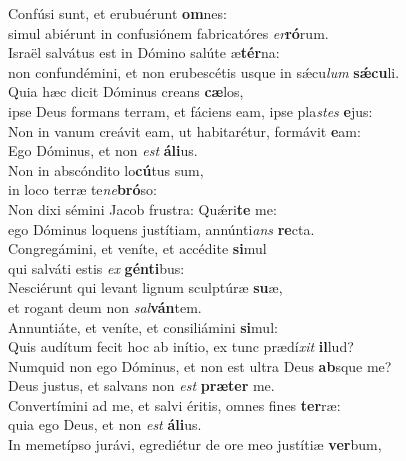 \evenverse Confúsi sunt, et erubuérunt \textbf{om}nes:~\*\\
\evenverse simul abiérunt in confusiónem fabricatóres \textit{er}\textbf{ró}rum.\\
\oddverse Israël salvátus est in Dómino salúte æ\textbf{tér}na:~\*\\
\oddverse non confundémini, et non erubescétis usque in sǽcu\textit{lum} \textbf{sǽ}\textbf{cu}li.\\
\evenverse Quia hæc dicit Dóminus creans \textbf{cæ}los,~\*\\
\evenverse ipse Deus formans terram, et fáciens eam, ipse pla\textit{stes} \textbf{e}jus:\\
\oddverse Non in vanum creávit eam, ut habitarétur, formávit \textbf{e}am:~\*\\
\oddverse Ego Dóminus, et non \textit{est} \textbf{á}\textbf{li}us.\\
\evenverse Non in abscóndito lo\textbf{cú}tus sum,~\*\\
\evenverse in loco terræ te\textit{ne}\textbf{bró}so:\\
\oddverse Non dixi sémini Jacob frustra: Quǽri\textbf{te} me:~\*\\
\oddverse ego Dóminus loquens justítiam, annúnti\textit{ans} \textbf{re}cta.\\
\evenverse Congregámini, et veníte, et accédite \textbf{si}mul~\*\\
\evenverse qui salváti estis \textit{ex} \textbf{gén}\textbf{ti}bus:\\
\oddverse Nesciérunt qui levant lignum sculptúræ \textbf{su}æ,~\*\\
\oddverse et rogant deum non \textit{sal}\textbf{ván}tem.\\
\evenverse Annuntiáte, et veníte, et consiliámini \textbf{si}mul:~\*\\
\evenverse Quis audítum fecit hoc ab inítio, ex tunc prædí\textit{xit} \textbf{il}lud?\\
\oddverse Numquid non ego Dóminus, et non est ultra Deus \textbf{ab}sque me?~\*\\
\oddverse Deus justus, et salvans non \textit{est} \textbf{præ}\textbf{ter} me.\\
\evenverse Convertímini ad me, et salvi éritis, omnes fines \textbf{ter}ræ:~\*\\
\evenverse quia ego Deus, et non \textit{est} \textbf{á}\textbf{li}us.\\
\oddverse In memetípso jurávi, egrediétur de ore meo justítiæ \textbf{ver}bum,~\*\\
